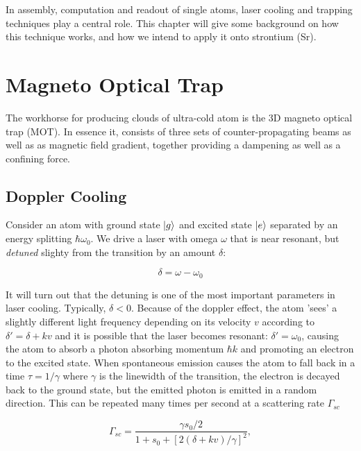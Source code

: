 In assembly, computation and readout of single atoms, laser cooling and trapping techniques play a central role. This chapter will give some background on how this technique works, and how we intend to apply it onto strontium (Sr).


\section{Magneto Optical Trap}

The workhorse for producing clouds of ultra-cold atom is the 3D magneto optical trap (MOT). In essence it, consists of three sets of counter-propagating beams as well as as magnetic field gradient, together providing a dampening as well as a confining force. 

\subsection{Doppler Cooling}

Consider an atom with ground state $\lvert g\rangle$ and excited state $\lvert e\rangle$ separated by an energy splitting $\hbar \omega_0$. We drive a laser with omega $\omega$ that is near resonant, but \emph{detuned} slighty from the transition by an amount $\delta$:

\begin{equation}\label{detuning}
	\delta = \omega - \omega_0
\end{equation}

It will turn out that the detuning is one of the most important parameters in laser cooling. Typically, $\delta <0$. Because of the doppler effect, the atom 'sees' a slightly different light frequency depending on its velocity $v$ according to $\delta'=\delta+kv$ and it is possible that the laser becomes resonant: $\delta' = \omega_0$, causing the atom to absorb a photon absorbing momentum $\hbar k$ and promoting an electron to the excited state. When spontaneous emission causes the atom to fall back in a time $\tau = 1/\gamma$ where $\gamma$ is the linewidth of the transition, the electron is decayed back to the ground state, but the emitted photon is emitted in a random direction. This can be repeated many times per second at a scattering rate $\Gamma_{sc}$ \cite{Metcalf1999}

\begin{equation}\label{eq:ScatteringFrequency}
	\Gamma_{sc} = \frac{ \gamma s_0 /2}{1+s_0+\left[2(\delta+ k v)/\gamma\right]^2},
\end{equation}

